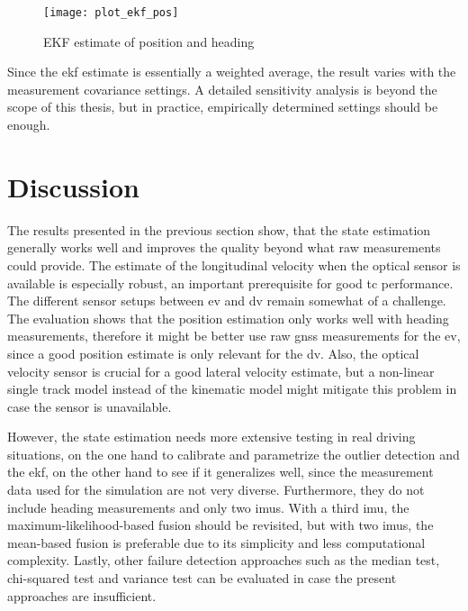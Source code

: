 \begin{figure}[t]
	\centering
	\texttt{[image: plot\_ekf\_pos]}%
	\caption{EKF estimate of position and heading}
	\label{fig:ekf-position}
\end{figure}

Since the \gls{ekf} estimate is essentially a weighted average, the result varies with the measurement covariance settings. A detailed sensitivity analysis is beyond the scope of this thesis, but in practice, empirically determined settings should be enough.

\section{Discussion}
The results presented in the previous section show, that the state estimation generally works well and improves the quality beyond what raw measurements could provide. The estimate of the longitudinal velocity when the optical sensor is available is especially robust, an important prerequisite for good \gls{tc} performance. The different sensor setups between \gls{ev} and \gls{dv} remain somewhat of a challenge. The evaluation shows that the position estimation only works well with heading measurements, therefore it might be better use raw \gls{gnss} measurements for the \gls{ev}, since a good position estimate is only relevant for the \gls{dv}. Also, the optical velocity sensor is crucial for a good lateral velocity estimate, but a non-linear single track model instead of the kinematic model might mitigate this problem in case the sensor is unavailable.

However, the state estimation needs more extensive testing in real driving situations, on the one hand to calibrate and parametrize the outlier detection and the \gls{ekf}, on the other hand to see if it generalizes well, since the measurement data used for the simulation are not very diverse. Furthermore, they do not include heading measurements and only two \glspl{imu}. With a third \gls{imu}, the maximum-likelihood-based fusion should be revisited, but with two \glspl{imu}, the mean-based fusion is preferable due to its simplicity and less computational complexity. Lastly, other failure detection approaches such as the median test, chi-squared test and variance test can be evaluated in case the present approaches are insufficient.
